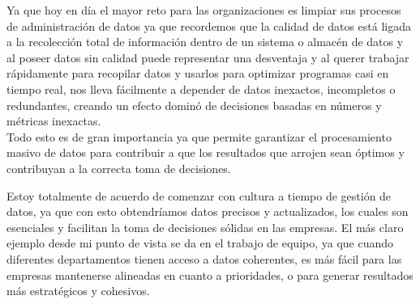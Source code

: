 \documentclass{article}
\begin{document}
Ya que hoy en día el mayor reto para las organizaciones es limpiar sus procesos de administración de datos  ya que recordemos que la calidad 
de datos está ligada a la recolección total de información dentro de un sistema o almacén de datos y al poseer datos sin calidad puede 
representar una desventaja y al querer trabajar rápidamente para recopilar datos y usarlos para optimizar programas casi en tiempo real,  
nos lleva fácilmente a depender de datos inexactos, incompletos o redundantes, creando un efecto dominó de decisiones basadas en números y 
métricas inexactas. \\

Todo esto es de gran importancia ya que permite garantizar el procesamiento masivo de datos para contribuir a que los resultados que arrojen 
sean óptimos y contribuyan a la correcta toma de decisiones. 

Estoy totalmente de acuerdo de comenzar con cultura a tiempo de gestión de datos, ya que con esto  obtendríamos datos precisos y actualizados, 
los cuales son esenciales y facilitan la toma de decisiones sólidas en las empresas. El más claro ejemplo desde mi punto de vista se da en el
trabajo de equipo, ya que cuando diferentes departamentos tienen acceso a datos coherentes, es más fácil para las empresas mantenerse alineadas 
en cuanto a prioridades, o para generar resultados más estratégicos y cohesivos.  
\end{document}
